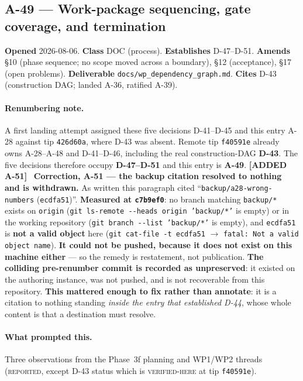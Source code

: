 \documentclass[
  10pt,
]{article}
\newcommand{\amdnew}[1]{{\color{amdcolor}\footnotesize\textbf{[ADDED #1]}}\ }
\begin{document}
\hypertarget{a-49}{%
\subsection{A-49 --- Work-package sequencing, gate coverage, and termination}\label{a-49}}

\textbf{Opened} 2026-08-06. \textbf{Class} DOC (process). \textbf{Establishes} D-47--D-51. \textbf{Amends} §10 (phase sequence; no scope moved across a boundary), §12 (acceptance), §17 (open problems). \textbf{Deliverable} \texttt{docs/wp\_dependency\_graph.md}. \textbf{Cites} D-43 (construction DAG; landed A-36, ratified A-39).

\paragraph{Renumbering note.}
A first landing attempt assigned these five decisions D-41--D-45 and this entry A-28 against tip \texttt{426d60a}, where D-43 was absent. Remote tip \texttt{f40591e} already owns A-28--A-48 and D-41--D-46, including the real construction-DAG \textbf{D-43}. The five decisions therefore occupy \textbf{D-47--D-51} and this entry is \textbf{A-49}. \amdnew{A-51} \textbf{Correction, A-51 --- the backup citation resolved to nothing and is withdrawn.} As written this paragraph cited ``\texttt{backup/a28-wrong-numbers} (\texttt{ecdfa51})''. \textbf{Measured at \texttt{c7b9ef0}}: no branch matching \texttt{backup/*} exists on \texttt{origin} (\texttt{git ls-remote -{}-heads origin 'backup/*'} is empty) or in the working repository (\texttt{git branch -{}-list 'backup/*'} is empty), and \texttt{ecdfa51} is \textbf{not a valid object} here (\texttt{git cat-file -t ecdfa51} $\to$ \texttt{fatal: Not a valid object name}). \textbf{It could not be pushed, because it does not exist on this machine either} --- so the remedy is restatement, not publication. \textbf{The colliding pre-renumber commit is recorded as unpreserved}: it existed on the authoring instance, was not pushed, and is not recoverable from this repository. \textbf{This mattered enough to fix rather than annotate}: it is a citation to nothing standing \emph{inside the entry that established D-44}, whose whole content is that a destination must resolve.

\paragraph{What prompted this.}
Three observations from the Phase~3f planning and WP1/WP2 threads (\textsc{reported}, except D-43 status which is \textsc{verified-here} at tip \texttt{f40591e}).
\end{document}
